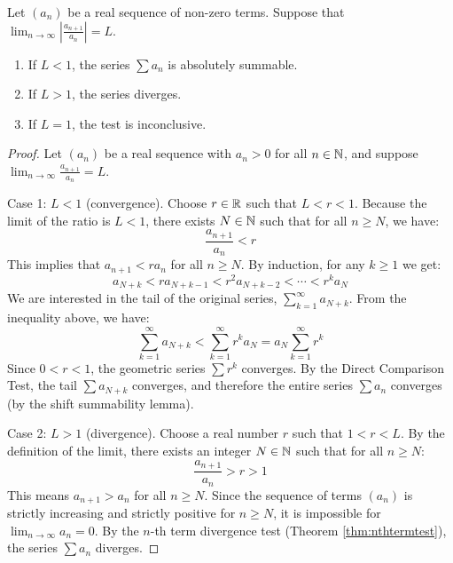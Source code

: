 \documentclass[../analysis1.tex]{subfiles}
\begin{document}
\begin{theorem}
\label{thm:ratiotest}
    \begin{shaded*}
        Let $(a_n)$ be a real sequence of non-zero terms. Suppose that $\lim_{n \to \infty} \left| \frac{a_{n+1}}{a_n} \right| = L$.
        \begin{enumerate}
            \item[1.] If $L < 1$, the series $\sum a_n$ is absolutely summable.
            \item[2.] If $L > 1$, the series diverges.
            \item[3.] If $L = 1$, the test is inconclusive.
        \end{enumerate}
    \end{shaded*}
\end{theorem}
\begin{proof}
    Let $(a_n)$ be a real sequence with $a_n > 0$ for all $n \in \mathbb{N}$, and suppose $\lim_{n \to \infty} \frac{a_{n+1}}{a_n} = L$.\par

    Case 1: $L<1$ (convergence). Choose $r\in\mathbb{R}$ such that $L < r < 1$. Because the limit of the ratio is $L<1$, there exists $N \in \mathbb{N}$ such that for all $n \ge N$, we have: \[ \frac{a_{n+1}}{a_n} < r \]
    This implies that $a_{n+1} < r a_n$ for all $n \ge N$. By induction, for any $k \ge 1$ we get:
    \[ a_{N+k} < r a_{N+k-1} < r^2 a_{N+k-2} < \cdots < r^k a_N \]
    We are interested in the tail of the original series, $\sum_{k=1}^{\infty} a_{N+k}$. From the inequality above, we have:
    \[ \sum_{k=1}^{\infty} a_{N+k} < \sum_{k=1}^{\infty} r^k a_N = a_N \sum_{k=1}^{\infty} r^k \]
    Since $0 < r < 1$, the geometric series $\sum r^k$ converges. By the Direct Comparison Test, the tail $\sum a_{N+k}$ converges, and therefore the entire series $\sum a_n$ converges (by the shift summability lemma).\par

    Case 2: $L > 1$ (divergence). Choose a real number $r$ such that $1 < r < L$. By the definition of the limit, there exists an integer $N \in \mathbb{N}$ such that for all $n \ge N$:
    \[ \frac{a_{n+1}}{a_n} > r > 1 \]
    This means $a_{n+1} > a_n$ for all $n \ge N$. Since the sequence of terms $(a_n)$ is strictly increasing and strictly positive for $n \ge N$, it is impossible for $\lim_{n \to \infty} a_n = 0$. By the $n$-th term divergence test (Theorem \ref{thm:nthtermtest}), the series $\sum a_n$ diverges.\qedhere
\end{proof}
\end{document}
